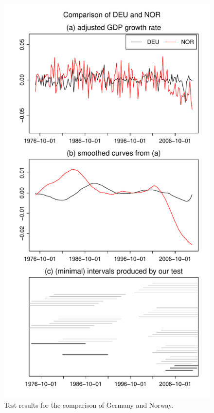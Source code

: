 \documentclass[12pt]{article}
\begin{document}
\begin{figure}
\begin{minipage}[t]{0.24\textwidth}
\includegraphics[width=\textwidth]{../output/plots/gdp/DEU_vs_NOR}
\caption{Test results for the comparison of Germany and Norway.}\label{fig:Germany:Norway}
\end{minipage}

\end{figure}
\end{document}
